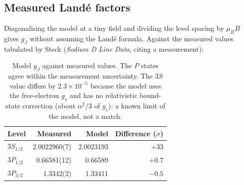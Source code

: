 \subsection{Measured Land\'e factors}
Diagonalising the model at a tiny field and dividing the level spacing by $\mu_B B$ gives $g_J$ without assuming the Land\'e formula.
Against the measured values tabulated by Steck (\emph{Sodium D Line Data}, citing a measurement):
\begin{table}[h]
\centering
\begin{tabular}{lrrr}
\toprule
Level & Measured & Model & Difference ($\sigma$)\\
\midrule
$3S_{1/2}$ & 2.0022960(7) & 2.0023193 & $+33$\\
$3P_{1/2}$ & 0.66581(12) & 0.66589 & $+0.7$\\
$3P_{3/2}$ & 1.3342(2) & 1.33411 & $-0.5$\\
\bottomrule
\end{tabular}
\caption{Model $g_J$ against measured values. The $P$ states agree within the measurement uncertainty. The $3S$ value differs by $2.3\times10^{-5}$ because the
model uses the free-electron $g_s$ and has no relativistic bound-state correction (about $\alpha^2/3$ of $g_s$): a known limit of the model, not a match.}
\end{table}
